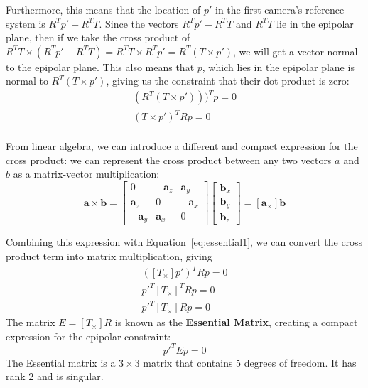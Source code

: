 \documentclass[a4paper, 12pt]{article}
\renewcommand\emph{\textbf}
\begin{document}
Furthermore, this means that the location of $p'$ in the first camera's reference system is $R^Tp' - R^TT$. Since the vectors $R^Tp' - R^TT$ and $R^TT$ lie in the epipolar plane, then if we take the cross product of $R^TT\times(R^Tp' -R^T T) = R^TT \times R^Tp' = R^T(T \times p')$, we will get a vector normal to the epipolar plane. This also means that $p$, which lies in the epipolar plane is normal to $R^T(T\times p')$, giving us the constraint that their dot product is zero:
\begin{equation}
    \begin{split}
    	(R^T(T\times p')))^T p = 0\\
    	(T\times p')^T R p = 0 \\ 
    \end{split}
    \label{eq:essential1}
\end{equation}

From linear algebra, we can introduce a different and compact expression for the cross product: we can represent the cross product between any two vectors $a$ and $b$ as a matrix-vector multiplication:
\begin{equation}
    \mathbf{a}\times \mathbf{b} = \begin{bmatrix} 0 & -\mathbf{a}_z & \mathbf{a}_y \\ \mathbf{a}_z & 0 & -\mathbf{a}_x \\ -\mathbf{a}_y & \mathbf{a}_x & 0\end{bmatrix}\begin{bmatrix} \mathbf{b}_x \\ \mathbf{b}_y \\ \mathbf{b}_z\end{bmatrix} = [\mathbf{a}_\times] \mathbf{b}
\end{equation}

Combining this expression with Equation~\ref{eq:essential1}, we can convert the cross product term into matrix multiplication, giving
\begin{equation}
    \begin{split}
        ([T_\times] p')^T R p = 0 \\ 
    	  p'^T [T_\times]^T R p = 0 \\
	  p'^T [T_\times] R p = 0
    \end{split}
\end{equation}
The matrix $E = [T_\times]R$ is known as the \emph{Essential Matrix}, creating a compact expression for the epipolar constraint: 
\begin{equation}
    p'^T E p = 0
\end{equation}
The Essential matrix is a $3\times3$ matrix that contains 5 degrees of freedom. It has rank 2 and is singular. 
\end{document}
